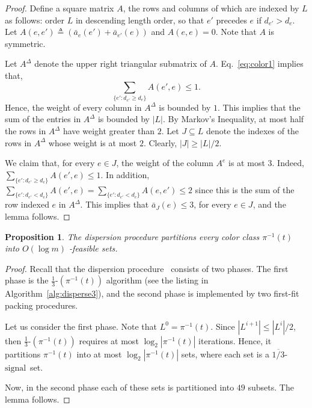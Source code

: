 \documentclass[11pt]{article}
\newenvironment{proof sketch}{\noindent {\bf Proof sketch:} }{\hfill \qed}
\newtheorem{proposition}{Proposition}
\newcommand{\sinr}{\text{\sc{sinr}}}
\newcommand{\disperse}{\text{\emph{disperse}}}
\newcommand{\eqdf}{\triangleq}
\newcommand{\At}{A^{\Delta}}
\newcommand{\barsignal}{$\text{signal}$}
\begin{document}
\begin{proof}
  Define a square matrix $A$, the rows and columns of which are
  indexed by $L$ as follows: order $L$ in descending length order, so that $e'$
  precedes $e$ if $d_{e'}> d_e$.  Let $A({e,e'}) \eqdf (\bar
  a_e(e')+\bar a_{e'}(e))$ and $A(e,e)=0$. Note that $A$ is symmetric.

  Let $\At$ denote the upper right triangular submatrix of $A$.
  Eq.~\ref{eq:color1} implies that, $$\sum_{\{e': d_{e'} \geq d_e\}}
  A(e',e) \leq 1.$$ Hence, the weight of every column in $\At$ is
  bounded by $1$. This implies that the sum of the entries in $\At$ is
  bounded by $|L|$.  By Markov's Inequality, at most half the rows in
  $\At$ have weight greater than $2$.  Let $J\subseteq L$ denote the
  indexes of the rows in $\At$ whose weight is at most $2$.
Clearly, $|J|\geq |L|/2$.

We claim that, for every $e\in J$, the weight of the column $A^e$ is
at most $3$. Indeed, $\sum_{\{e' :d_{e'}\geq d_e\}} A(e',e) \leq 1$. In
addition, $\sum_{\{e' :d_{e'}< d_e\}} A(e',e)= \sum_{\{e' :d_{e'}< d_e\}}
A(e,e')\leq 2$ since this is the sum of the row indexed $e$ in $\At$.
This implies that ${\bar a}_J(e)\leq 3$, for every $e\in J$, and the lemma follows.
\end{proof}

\begin{proposition}\label{prop:disperse}
  The dispersion procedure partitions every color class $\pi^{-1}(t)$
  into $O(\log m)$ \sinr-feasible sets.
\end{proposition}
\begin{proof}
  Recall that the dispersion procedure \disperse\ consists of two phases.
  The first phase is the $\frac{1}{3}$-\disperse$(\pi^{-1}(t))$ algorithm (see the listing in Algorithm~\ref{alg:disperse3}), 
  and the second phase is implemented by two first-fit packing procedures.
  
  Let us consider the first phase. Note that $L^0 = \pi^{-1}(t)$.
  Since $|L^{i+1}| \leq |L^i|/2$, then  $\frac{1}{3}$-\disperse$(\pi^{-1}(t))$ 
  requires at most $\log_2 |\pi^{-1}(t)|$ iterations. 
  Hence, it partitions $\pi^{-1}(t)$ into at most $\log_2 |\pi^{-1}(t)|$ sets, where each set is a
  $\overline{1/3}$-\barsignal\ set.  
  
  Now, in the second phase each of these sets is partitioned into $49$ subsets.
  The lemma follows.
\end{proof}
\end{document}
